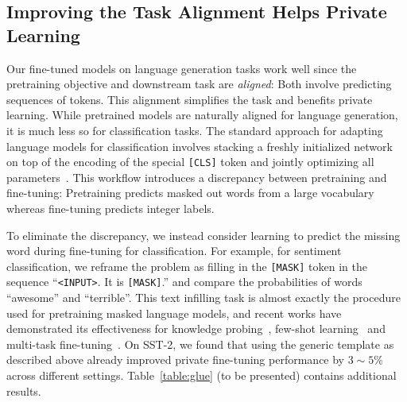 


\subsection{Improving the Task Alignment Helps Private Learning}\label{sec:task_alignment}
Our fine-tuned models on language generation tasks work well since the pretraining objective and downstream task are \emph{aligned}: Both involve predicting sequences of tokens.
This alignment simplifies the task and benefits private learning. 
While pretrained models are naturally aligned for language generation, it is much less so for classification tasks. The standard approach for adapting language models for classification involves stacking a freshly initialized network on top of the encoding of the special \texttt{[CLS]} token and jointly optimizing all parameters~\citep{devlin2018bert}. 
This workflow introduces a discrepancy between pretraining and fine-tuning: Pretraining predicts masked out words from a large vocabulary whereas fine-tuning predicts integer labels.

To eliminate the discrepancy, we instead consider learning to predict the missing word during fine-tuning for classification. 
For example, for sentiment classification, we reframe the problem as filling in the \texttt{[MASK]} token in the sequence ``\texttt{<INPUT>}. It is \texttt{[MASK]}.'' and compare the probabilities of words ``awesome'' and ``terrible''.
This text infilling task is almost exactly the procedure used for pretraining masked language models, and recent works have demonstrated its effectiveness for knowledge probing~\citep{petroni2019language}, few-shot learning~\citep{gao2020making} and multi-task fine-tuning~\citep{wei2021finetuned}. 
On SST-2, we found that using the generic template as described above already improved private fine-tuning performance by $3\sim5\%$ across different settings.
Table~\ref{table:glue} (to be presented) contains additional results.
